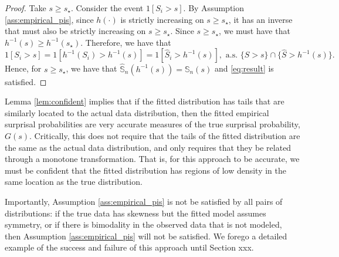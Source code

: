 \documentclass[a4paper,11pt]{article}
\begin{document}
\begin{proof}
Take $s\ge s_\star$. Consider the event $1[S_i> s]$. By Assumption  \ref{ass:empirical_pis}, since $h(\cdot)$ is strictly increasing on $s\ge s_\star$, it has an inverse that must also be strictly increasing on $s\ge s_\star$. Since $s\ge s_\star$, we must have that $h^{-1}(s)\ge h^{-1}(s_\star)$. Therefore, we have that 
\begin{equation*}\label{eq:new_indx}
1[S_i> s]=1[h^{-1}(S_i)> h^{-1}(s)]=1[\widehat{S}_i> h^{-1}(s)],\text{ a.s. }\{S>s\}\cap\{\widehat{S}>h^{-1}(s)\}   . 
\end{equation*}
Hence, for $s\ge s_\star$, we have that $\widehat{\mathbb{S}}_n(h^{-1}(s))={\mathbb{S}}_n(s)$ and \eqref{eq:result} is satisfied.


%
\end{proof}


Lemma \ref{lem:confident} implies that if the fitted distribution has tails that are similarly located to the actual data distribution, then the fitted empirical surprisal probabilities are very accurate measures of the true surprisal probability, $G(s)$. Critically, this does not require that the tails of the fitted distribution are the same as the actual data distribution, and only requires that they be related through a monotone transformation. That is, for this approach to be accurate, we must be confident that the fitted distribution has regions of low density in the same location as the true distribution.

Importantly, Assumption \ref{ass:empirical_pis} is not be satisfied by all pairs of distributions: if the true data has skewness but the fitted model assumes symmetry, or if there is bimodality in the observed data that is not modeled, then Assumption \ref{ass:empirical_pis} will not be satisfied.  We forego a detailed example of the success and failure of this approach until Section xxx. 
\end{document}
